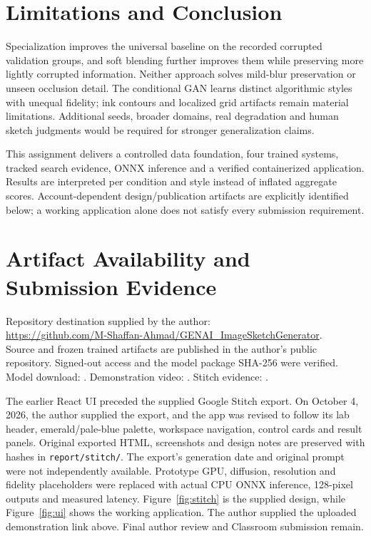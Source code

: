 \documentclass[conference]{IEEEtran}
\begin{document}
\section{Limitations and Conclusion}
Specialization improves the universal baseline on the recorded corrupted validation groups, and soft blending further improves them while preserving more lightly corrupted information. Neither approach solves mild-blur preservation or unseen occlusion detail. The conditional GAN learns distinct algorithmic styles with unequal fidelity; ink contours and localized grid artifacts remain material limitations. Additional seeds, broader domains, real degradation and human sketch judgments would be required for stronger generalization claims.

This assignment delivers a controlled data foundation, four trained systems, tracked search evidence, ONNX inference and a verified containerized application. Results are interpreted per condition and style instead of inflated aggregate scores. Account-dependent design/publication artifacts are explicitly identified below; a working application alone does not satisfy every submission requirement.

\section*{Artifact Availability and Submission Evidence}
Repository destination supplied by the author:\\
\url{https://github.com/M-Shaffan-Ahmad/GENAI_ImageSketchGenerator}.\\
Source and frozen trained artifacts are published in the author's public repository. Signed-out access and the model package SHA-256 were verified. Model download: \ModelDownloadLink. Demonstration video: \DemoVideoLink. Stitch evidence: \StitchEvidenceStatus.

The earlier React UI preceded the supplied Google Stitch export. On October 4, 2026, the author supplied the export, and the app was revised to follow its lab header, emerald/pale-blue palette, workspace navigation, control cards and result panels. Original exported HTML, screenshots and design notes are preserved with hashes in \texttt{report/stitch/}. The export's generation date and original prompt were not independently available. Prototype GPU, diffusion, resolution and fidelity placeholders were replaced with actual CPU ONNX inference, 128-pixel outputs and measured latency. Figure~\ref{fig:stitch} is the supplied design, while Figure~\ref{fig:ui} shows the working application. The author supplied the uploaded demonstration link above. Final author review and Classroom submission remain.
\end{document}

